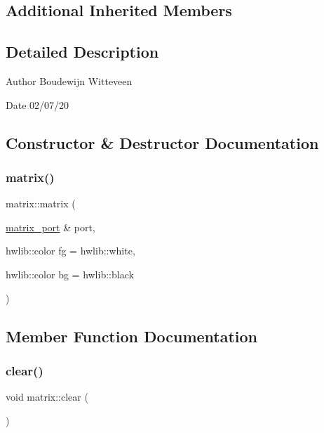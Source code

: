 \subsection*{Additional Inherited Members}


\subsection{Detailed Description}
\begin{DoxyAuthor}{Author}
Boudewijn Witteveen 
\end{DoxyAuthor}
\begin{DoxyDate}{Date}
02/07/20 
\end{DoxyDate}


\subsection{Constructor \& Destructor Documentation}
\mbox{\label{classmatrix_a5b188e2d48833305f8a1b6db34e40521}} 
\subsubsection{\texorpdfstring{matrix()}{matrix()}}
{\footnotesize\ttfamily matrix\+::matrix (\begin{DoxyParamCaption}\item[{\hyperlink{classmatrix__port}{matrix\+\_\+port} \&}]{port,  }\item[{hwlib\+::color}]{fg = {\ttfamily hwlib\+:\+:white},  }\item[{hwlib\+::color}]{bg = {\ttfamily hwlib\+:\+:black} }\end{DoxyParamCaption})\hspace{0.3cm}{\ttfamily [inline]}}



\subsection{Member Function Documentation}
\mbox{\label{classmatrix_a58f399a7e96f56100491d6d8ad235f68}} 
\subsubsection{\texorpdfstring{clear()}{clear()}}
{\footnotesize\ttfamily void matrix\+::clear (\begin{DoxyParamCaption}{ }\end{DoxyParamCaption})\hspace{0.3cm}{\ttfamily [virtual]}}

